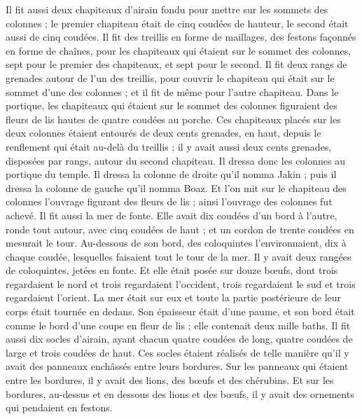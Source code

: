 \begin{multicols}{2}
Il fit aussi deux chapiteaux d'airain fondu pour mettre sur les sommets des colonnes ; le premier chapiteau était de cinq coudées de hauteur, le second était aussi de cinq coudées.
Il fit des treillis en forme de maillages, des festons façonnés en forme de chaînes, pour les chapiteaux qui étaient sur le sommet des colonnes, sept pour le premier des chapiteaux, et sept pour le second.
Il fit deux rangs de grenades autour de l’un des treillis, pour couvrir le chapiteau qui était sur le sommet d'une des colonnes ; et il fit de même pour l'autre chapiteau.
Dans le portique, les chapiteaux qui étaient sur le sommet des colonnes figuraient des fleurs de lis hautes de quatre coudées au porche.
Ces chapiteaux placés sur les deux colonnes étaient entourés de deux cents grenades, en haut, depuis le renflement qui était au-delà du treillis ; il y avait aussi deux cents grenades, disposées par rangs, autour du second chapiteau.
Il dressa donc les colonnes au portique du temple. Il dressa la colonne de droite qu’il nomma Jakin ; puis il dressa la colonne de gauche qu’il nomma Boaz.
Et l’on mit sur le chapiteau des colonnes l'ouvrage figurant des fleurs de lis ; ainsi l'ouvrage des colonnes fut achevé.
Il fit aussi la mer de fonte. Elle avait dix coudées d'un bord à l'autre, ronde tout autour, avec cinq coudées de haut ; et un cordon de trente coudées en mesurait le tour.
Au-dessous de son bord, des coloquintes l'environnaient, dix à chaque coudée, lesquelles faisaient tout le tour de la mer. Il y avait deux rangées de coloquintes, jetées en fonte.
Et elle était posée sur douze bœufs, dont trois regardaient le nord et trois regardaient l'occident, trois regardaient le sud et trois regardaient l'orient. La mer était sur eux et toute la partie postérieure de leur corps était tournée en dedans.
Son épaisseur était d'une paume, et son bord était comme le bord d'une coupe en fleur de lis ; elle contenait deux mille baths.
Il fit aussi dix socles d'airain, ayant chacun quatre coudées de long, quatre coudées de large et trois coudées de haut.
Ces socles étaient réalisés de telle manière qu'il y avait des panneaux enchâssés entre leurs bordures.
Sur les panneaux qui étaient entre les bordures, il y avait des lions, des bœufs et des chérubins. Et sur les bordures, au-dessus et en dessous des lions et des bœufs, il y avait des ornements qui pendaient en festons.

\end{multicols}
